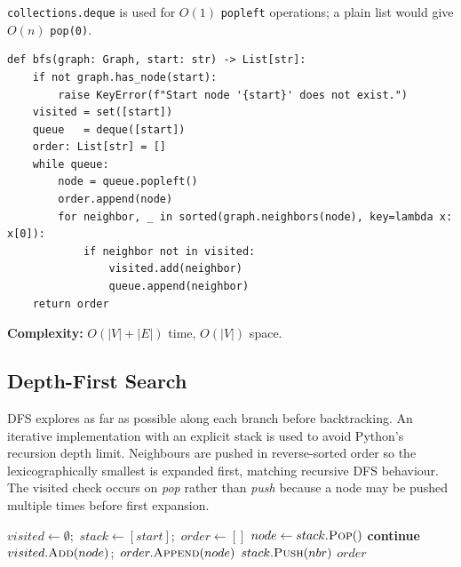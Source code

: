 \documentclass[12pt, a4paper]{article}
\begin{document}
\texttt{collections.deque} is used for $O(1)$ \texttt{popleft} operations;
a plain list would give $O(n)$ \texttt{pop(0)}.

\begin{lstlisting}[caption={BFS implementation (\texttt{src/algorithms/bfs.py}).}]
def bfs(graph: Graph, start: str) -> List[str]:
    if not graph.has_node(start):
        raise KeyError(f"Start node '{start}' does not exist.")
    visited = set([start])
    queue   = deque([start])
    order: List[str] = []
    while queue:
        node = queue.popleft()
        order.append(node)
        for neighbor, _ in sorted(graph.neighbors(node), key=lambda x: x[0]):
            if neighbor not in visited:
                visited.add(neighbor)
                queue.append(neighbor)
    return order
\end{lstlisting}

\textbf{Complexity:} $O(|V|+|E|)$ time, $O(|V|)$ space.

\subsection{Depth-First Search}
\label{sec:dfs}

DFS explores as far as possible along each branch before backtracking.
An iterative implementation with an explicit stack is used to avoid
Python's recursion depth limit. Neighbours are pushed in reverse-sorted
order so the lexicographically smallest is expanded first, matching
recursive DFS behaviour. The visited check occurs on \textit{pop} rather
than \textit{push} because a node may be pushed multiple times before
first expansion.

\begin{algorithm}[H]
\caption{Depth-First Search (Iterative)}
\begin{algorithmic}[1]
    \State $visited \gets \emptyset$;\ $stack \gets [start]$;\ $order \gets []$
        \State $node \gets stack.\textsc{Pop}()$
         \textbf{continue} \EndIf
        \State $visited.\textsc{Add}(node)$;\ $order.\textsc{Append}(node)$
                \State $stack.\textsc{Push}(nbr)$
            \EndIf
        \EndFor
    \EndWhile
    \Return $order$
\EndFunction
\end{algorithmic}
\end{algorithm}
\end{document}
